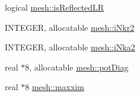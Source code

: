 \begin{DoxyCompactItemize}
\item 
logical \hyperlink{namespacemesh_ac40d4b15a769844035c498c2ed396e4c}{mesh::isReflectedLR}
\item 
INTEGER, allocatable \hyperlink{namespacemesh_a4a147979d603b0d2f61b08be8bd3e40e}{mesh::iNkr2}
\item 
INTEGER, allocatable \hyperlink{namespacemesh_a6103232aa20c5d4619b9016bda1e0cbe}{mesh::iNka2}
\item 
real $\ast$8, allocatable \hyperlink{namespacemesh_a6e7109b1ed1096ce6c3dbacaa4920158}{mesh::potDiag}
\item 
real $\ast$8 \hyperlink{namespacemesh_aa7d7e6a7c12152ba29110facf1d664ce}{mesh::maxxim}
\end{DoxyCompactItemize}

